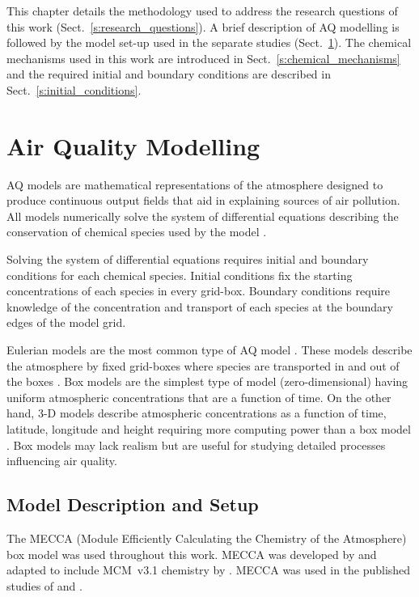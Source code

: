 \vspace{-4mm}
This chapter details the methodology used to address the research questions of this work (Sect.~\ref{s:research_questions}).
A brief description of AQ modelling is followed by the model set-up used in the separate studies (Sect.~\ref{s:modelling}). 
The chemical mechanisms used in this work are introduced in Sect.~\ref{s:chemical_mechanisms} and the required initial and boundary conditions are described in Sect.~\ref{s:initial_conditions}.

\vspace{-3mm}
\section{Air Quality Modelling} \label{s:modelling}
\vspace{-3mm}
AQ models are mathematical representations of the atmosphere designed to produce continuous output fields that aid in explaining sources of air pollution.
All models numerically solve the system of differential equations describing the conservation of chemical species used by the model \citep{Russell:2000}.

Solving the system of differential equations requires initial and boundary conditions for each chemical species.
Initial conditions fix the starting concentrations of each species in every grid-box.
Boundary conditions require knowledge of the concentration and transport of each species at the boundary edges of the model grid.

Eulerian models are the most common type of AQ model \citep{Russell:2000}.
These models describe the atmosphere by fixed grid-boxes where species are transported in and out of the boxes \citep{Seinfeld:2006}. 
Box models are the simplest type of model (zero-dimensional) having uniform atmospheric concentrations that are a function of time.
On the other hand, 3-D models describe atmospheric concentrations as a function of time, latitude, longitude and height requiring more computing power than a box model \citep{Seinfeld:2006}.
Box models may lack realism but are useful for studying detailed processes influencing air quality.

\subsection{Model Description and Setup} \label{ss:model_setup}
The MECCA (Module Efficiently Calculating the Chemistry of the Atmosphere) box model was used throughout this work.
MECCA was developed by \citet{Sander:2005} and adapted to include MCM~v3.1 chemistry by \citet{Butler:2011}.
MECCA was used in the published studies of \citet{Kubistin:2010} and \citet{Lourens:2016}.

